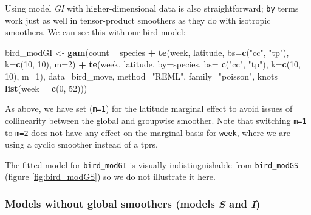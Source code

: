 \documentclass[12pt]{article}
\newenvironment{Shaded}{\begin{snugshade}}{\end{snugshade}}
\newcommand{\KeywordTok}[1]{\textcolor[rgb]{0.13,0.29,0.53}{\textbf{#1}}}
\newcommand{\DataTypeTok}[1]{\textcolor[rgb]{0.13,0.29,0.53}{#1}}
\newcommand{\DecValTok}[1]{\textcolor[rgb]{0.00,0.00,0.81}{#1}}
\newcommand{\StringTok}[1]{\textcolor[rgb]{0.31,0.60,0.02}{#1}}
\newcommand{\OperatorTok}[1]{\textcolor[rgb]{0.81,0.36,0.00}{\textbf{#1}}}
\newcommand{\NormalTok}[1]{#1}
\begin{document}
Using model \emph{GI} with higher-dimensional data is also
straightforward; \texttt{by} terms work just as well in tensor-product
smoothers as they do with isotropic smoothers. We can see this with our
bird model:

\begin{Shaded}
\begin{Highlighting}[]
\NormalTok{bird_modGI <-}\StringTok{ }\KeywordTok{gam}\NormalTok{(count }\OperatorTok{~}\StringTok{ }\NormalTok{species }\OperatorTok{+}
\StringTok{                   }\KeywordTok{te}\NormalTok{(week, latitude, }\DataTypeTok{bs=}\KeywordTok{c}\NormalTok{(}\StringTok{"cc"}\NormalTok{, }\StringTok{"tp"}\NormalTok{),}
                      \DataTypeTok{k=}\KeywordTok{c}\NormalTok{(}\DecValTok{10}\NormalTok{, }\DecValTok{10}\NormalTok{), }\DataTypeTok{m=}\DecValTok{2}\NormalTok{) }\OperatorTok{+}
\StringTok{                   }\KeywordTok{te}\NormalTok{(week, latitude, }\DataTypeTok{by=}\NormalTok{species, }\DataTypeTok{bs=} \KeywordTok{c}\NormalTok{(}\StringTok{"cc"}\NormalTok{, }\StringTok{"tp"}\NormalTok{),}
                      \DataTypeTok{k=}\KeywordTok{c}\NormalTok{(}\DecValTok{10}\NormalTok{, }\DecValTok{10}\NormalTok{), }\DataTypeTok{m=}\DecValTok{1}\NormalTok{),}
                 \DataTypeTok{data=}\NormalTok{bird_move, }\DataTypeTok{method=}\StringTok{"REML"}\NormalTok{, }\DataTypeTok{family=}\StringTok{"poisson"}\NormalTok{,}
                 \DataTypeTok{knots =} \KeywordTok{list}\NormalTok{(}\DataTypeTok{week =} \KeywordTok{c}\NormalTok{(}\DecValTok{0}\NormalTok{, }\DecValTok{52}\NormalTok{)))}
\end{Highlighting}
\end{Shaded}

As above, we have set (\texttt{m=1}) for the latitude marginal effect to
avoid issues of collinearity between the global and groupwise smoother.
Note that switching \texttt{m=1} to \texttt{m=2} does not have any
effect on the marginal basis for \texttt{week}, where we are using a
cyclic smoother instead of a tprs.

The fitted model for \texttt{bird\_modGI} is visually indistinguishable
from \texttt{bird\_modGS} (figure \ref{fig:bird_modGS}) so we do not
illustrate it here.

\subsubsection{\texorpdfstring{Models without global smoothers (models
\emph{S} and
\emph{I})}{Models without global smoothers (models S and I)}}\label{models-without-global-smoothers-models-s-and-i}
\end{document}
